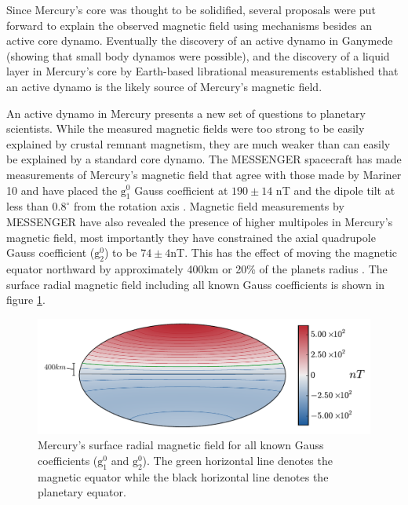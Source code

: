 Since Mercury's core was thought to be solidified, several proposals were put forward to explain the observed magnetic field using mechanisms besides an active core dynamo. Eventually the discovery of an active dynamo in Ganymede \citep{kivelson1996} (showing that small body dynamos were possible), and the discovery of a liquid layer in Mercury's core by Earth-based librational measurements \citep{margot2007,margot2012} established that an active dynamo is the likely source of Mercury's magnetic field.

An active dynamo in Mercury presents a new set of questions to planetary scientists. While the measured magnetic fields were too strong to be easily explained by crustal remnant magnetism, they are much weaker than can easily be explained by a standard core dynamo. The MESSENGER spacecraft has made measurements of Mercury's magnetic field that agree with those made by Mariner 10 and have placed the $\mathrm{g}_1^0$ Gauss coefficient at $190\pm 14$ nT and the dipole tilt at less than $0.8^{\circ}$ from the rotation axis \citep{anderson2012}. Magnetic field measurements by MESSENGER have also revealed the presence of higher multipoles in Mercury's magnetic field, most importantly they have constrained the axial quadrupole Gauss coefficient ($\mathrm{g}_{2}^0$) to be $74\pm4$nT. This has the effect of moving the magnetic equator northward by approximately 400km or 20\% of the planets radius \citep{anderson2012}. The surface radial magnetic field including all known Gauss coefficients is shown in figure \ref{fig:Mercurybr}.
\begin{figure}
	\centering
	\noindent\includegraphics[width=\linewidth]{Chapter4/figures/Mercury_br.pdf}
	\caption{Mercury's surface radial magnetic field for all known Gauss coefficients ($\mathrm{g}_1^0$ and $\mathrm{g}_2^0$). The green horizontal line denotes the magnetic equator while the black horizontal line denotes the planetary equator.}
	\label{fig:Mercurybr}
\end{figure}

